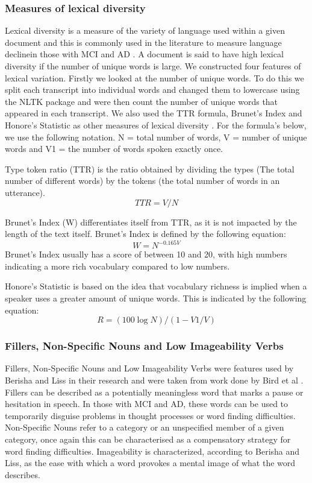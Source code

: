 \documentclass[12pt]{article}
\begin{document}
\subsubsection{Measures of lexical diversity}
Lexical diversity is a measure of the variety of language used within a given document and this is commonly used in the literature to measure language declinein those with MCI and AD \cite{Bucks2000, Le2012}. A document is said to have high lexical diversity if the number of unique words is large. We constructed four features of lexical variation. Firstly we looked at the number of unique words. To do this we split each transcript into individual words and changed them to lowercase using the NLTK package and were then count the number of unique words that appeared in each transcript. We also used the TTR formula, Brunet's Index and Honore's Statistic as other measures of lexical diversity \cite{Bucks2000}. For the formula's below, we use the following notation. N = total number of words, V = number of unique words and V1 = the number of words spoken exactly once.
\par 
Type token ratio (TTR) is the ratio obtained by dividing the types (The total number of different words) by the tokens (the total number of words in an utterance).
\begin{equation} \label{x1}
TTR = V / N
\end{equation}
\par 
Brunet's Index (W) differentiates itself from TTR, as it is not impacted by the length of the text itself. Brunet's Index is defined by the following equation:
\begin{equation} \label{x2}
W = N^{-0.165V}
\end{equation}
 Brunet's Index usually has a score of between 10 and 20, with high numbers indicating a more rich vocabulary compared to low numbers. \newline
\par 
Honore's Statistic is based on the idea that vocabulary richness is implied when a speaker uses a greater amount of unique words. This is indicated by the following equation: 
\begin{equation} \label{x3}
R = (100 \log N) / (1 - V1/V)
\end{equation}
\subsubsection{Fillers, Non-Specific Nouns and Low Imageability Verbs}
Fillers, Non-Specific Nouns and Low Imageability Verbs were features used by Berisha and Liss in their research \cite{Berisha2015} and were taken from work done by Bird et al \cite{Bird2000}. Fillers can be described as a potentially meaningless word that marks a pause or hesitation in speech. In those with MCI and AD, these words can be used to temporarily disguise problems in thought processes or word finding difficulties. Non-Specific Nouns refer to a category or an unspecified member of a given category, once again this can be characterised as a compensatory strategy for word finding difficulties. Imageability is characterized, according to Berisha and Liss\cite{Berisha2015}, as the ease with which a word provokes a mental image of what the word describes. 
\end{document}
